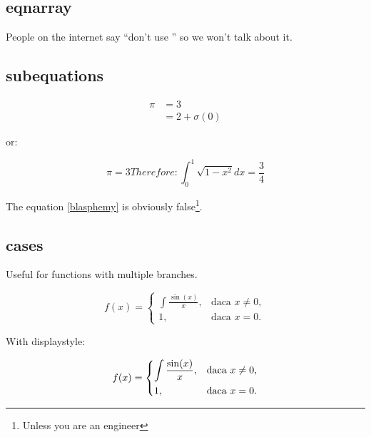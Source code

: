\subsection{eqnarray}
People on the internet say ``don't use '' so we won't talk about it.

\subsection{subequations}
\begin{example}
\begin{subequations}
\begin{align}
  \pi &= 3\\
  &= 2 + \sigma(0)
\end{align}
\end{subequations}
\end{example}

or:

\begin{example}
\begin{subequations}
\begin{equation}
  \pi = 3\label{blasphemy}
\end{equation}
Therefore:
\begin{equation}
  \int_0^1\sqrt{1-x^2} dx = \frac{3}{4}
\end{equation}
\end{subequations}

The equation \eqref{blasphemy} %
is obviously false\footnote{
  Unless you are an engineer}.
\end{example}


\subsection{cases}
Useful for functions with multiple branches.

\begin{example}
\[f(x) =
\begin{cases}
  \int\frac{\sin(x)}{x},&\text{daca } x \neq 0,\\
  1,&\text{daca } x=0.
\end{cases}
\]
\end{example}

With displaystyle:\\
\begin{example}
\[f(x) =
\begin{dcases}
  \int\frac{\sin(x)}{x},&\text{daca } x \neq 0,\\
  1,&\text{daca } x=0.
\end{dcases}
\]
\end{example}

